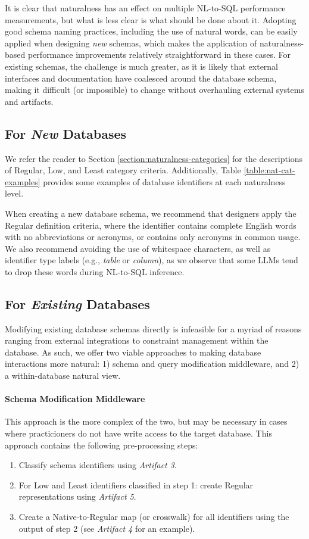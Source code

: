 It is clear that naturalness has an effect on multiple NL-to-SQL performance measurements, but what is less clear is what should be done about it.
Adopting good schema naming practices, including the use of natural words, can be easily applied when designing \emph{new} schemas, which makes the application of naturalness-based performance improvements relatively straightforward in these cases.
For existing schemas, the challenge is much greater, as it is likely that external interfaces and documentation have coalesced around the database schema, making it difficult (or impossible) to change without overhauling external systems and artifacts.

\subsection{For \emph{New} Databases}
We refer the reader to Section \ref{section:naturalness-categories} for the descriptions of Regular, Low, and Least category criteria. 
Additionally, Table \ref{table:nat-cat-examples} provides some examples of database identifiers at each naturalness level.

When creating a new database schema, we recommend that designers apply the Regular definition criteria, where the identifier contains complete English words with no abbreviations or acronyms, or contains only acronyms in common usage.
We also recommend avoiding the use of whitespace characters, as well as identifier type labels (e.g., \emph{table} or \emph{column}), as we observe that some LLMs tend to drop these words during NL-to-SQL inference.

\subsection{For \emph{Existing} Databases}

Modifying existing database schemas directly is infeasible for a myriad of reasons ranging from external integrations to constraint management within the database.
As such, we offer two viable approaches to making database interactions more natural: 1) schema and query modification middleware, and 2) a within-database natural view.

\paragraph{\textbf{Schema Modification Middleware}}
This approach is the more complex of the two, but may be necessary in cases where practicioners do not have write access to the target database.
This approach contains the following pre-processing steps:
\begin{enumerate}
  \item Classify schema identifiers using \emph{Artifact 3}.
  \item For Low and Least identifiers classified in step 1: create Regular representations using \emph{Artifact 5}.
  \item Create a Native-to-Regular map (or crosswalk) for all identifiers using the output of step 2 (see \emph{Artifact 4} for an example).
\end{enumerate}

